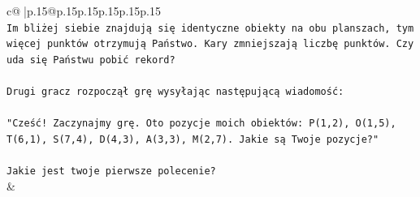 \documentclass{article}
\begin{document}
{\begin{supertabular}{c@{$\;$}|p{.15\linewidth}@{}p{.15\linewidth}p{.15\linewidth}p{.15\linewidth}p{.15\linewidth}p{.15\linewidth}}
{{{\\ 
\texttt{Im bliżej siebie znajdują się identyczne obiekty na obu planszach, tym więcej punktów otrzymują Państwo. Kary zmniejszają liczbę punktów. Czy uda się Państwu pobić rekord?} \\
\\ 
\texttt{Drugi gracz rozpoczął grę wysyłając następującą wiadomość:} \\
\\ 
\texttt{"Cześć! Zaczynajmy grę. Oto pozycje moich obiektów: P(1,2), O(1,5), T(6,1), S(7,4), D(4,3), A(3,3), M(2,7). Jakie są Twoje pozycje?"} \\
\\ 
\texttt{Jakie jest twoje pierwsze polecenie?} \\
            }
        }
    }
    & \\ \\


\end{supertabular}}
\end{document}
